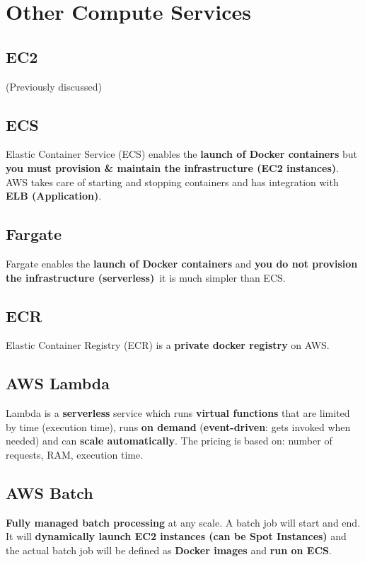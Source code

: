 \section{Other Compute Services}\label{sec:other-compute-services}

\subsection{EC2}\label{subsec:ec2}
(Previously discussed)

\subsection{ECS}\label{subsec:ecs}
Elastic Container Service (ECS) enables the \textbf{launch of Docker containers} but \textbf{you must provision \& maintain the infrastructure (EC2 instances)}\@.
AWS takes care of starting and stopping containers and has integration with \textbf{ELB (Application)}\@.

\subsection{Fargate}\label{subsec:fargate}
Fargate enables the \textbf{launch of Docker containers} and \textbf{you do not provision the infrastructure (serverless)}\, it is much simpler than ECS\@.

\subsection{ECR}\label{subsec:ecr}
Elastic Container Registry (ECR) is a \textbf{private docker registry} on AWS\@.

\subsection{AWS Lambda}\label{subsec:aws-lambda}
Lambda is a \textbf{serverless} service which runs \textbf{virtual functions} that are limited by time (execution time), runs \textbf{on demand} (\textbf{event-driven}: gets invoked when needed) and can \textbf{scale automatically}\@.
The pricing is based on: number of requests, RAM, execution time.

\subsection{AWS Batch}\label{subsec:aws-batch}
\textbf{Fully managed batch processing} at any scale.
A batch job will start and end.
It will \textbf{dynamically launch EC2 instances (can be Spot Instances)} and the actual batch job will be defined as \textbf{Docker images} and \textbf{run on ECS}\@.

